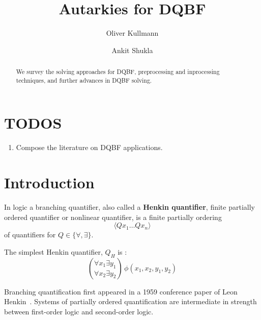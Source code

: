 \documentclass[runningheads]{llncs}
\begin{document}
\title{Autarkies for DQBF}

\author{Oliver Kullmann \and Ankit Shukla}


\maketitle

\begin{abstract}
We survey the solving approaches for DQBF, preprocessing and inprocessing techniques, and further advances in DQBF solving.
\end{abstract}


\setcounter{section}{-1}
\section{TODOS}
\label{sec:todos}

\begin{enumerate}
\item Compose the literature on DQBF applications.
\end{enumerate}


\section{Introduction}
\label{sec:intro}

In logic a branching quantifier, also called a \textbf{Henkin quantifier}, finite partially ordered quantifier or nonlinear quantifier, is a finite partially ordering 
\[ \langle Qx_{1}\dots Qx_{n}\rangle \]
of quantifiers for $Q  \in \{\forall,\exists\}$.
	
The simplest Henkin quantifier, $Q_{H}$ is :
\begin{displaymath}
\binom{\forall x_{1} \exists y_{1}}{\forall x_{2} \exists y_{2}} \, \phi(x_{1},x_{2},y_{1},y_{2})
\end{displaymath}

Branching quantification first appeared in a 1959 conference paper of Leon Henkin~\cite{henkin1961some}.
Systems of partially ordered quantification are intermediate in strength between first-order logic and second-order logic.
	
\end{document}
